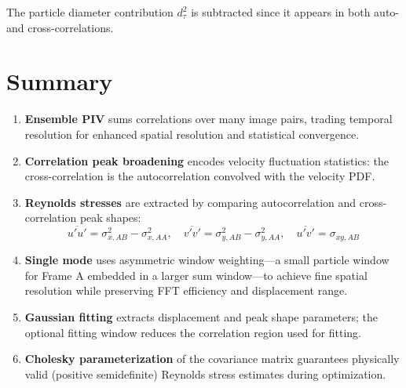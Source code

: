 \documentclass[11pt,a4paper]{article}
\begin{document}
The particle diameter contribution $d_\tau^2$ is subtracted since it appears in both auto- and cross-correlations.

\section{Summary}

\begin{enumerate}
    \item \textbf{Ensemble PIV} sums correlations over many image pairs, trading temporal resolution for enhanced spatial resolution and statistical convergence.

    \item \textbf{Correlation peak broadening} encodes velocity fluctuation statistics: the cross-correlation is the autocorrelation convolved with the velocity PDF.

    \item \textbf{Reynolds stresses} are extracted by comparing autocorrelation and cross-correlation peak shapes:
    \begin{equation*}
        \overline{u'u'} = \sigma_{x,AB}^2 - \sigma_{x,AA}^2, \quad \overline{v'v'} = \sigma_{y,AB}^2 - \sigma_{y,AA}^2, \quad \overline{u'v'} = \sigma_{xy,AB}
    \end{equation*}

    \item \textbf{Single mode} uses asymmetric window weighting---a small particle window for Frame A embedded in a larger sum window---to achieve fine spatial resolution while preserving FFT efficiency and displacement range.

    \item \textbf{Gaussian fitting} extracts displacement and peak shape parameters; the optional fitting window reduces the correlation region used for fitting.

    \item \textbf{Cholesky parameterization} of the covariance matrix guarantees physically valid (positive semidefinite) Reynolds stress estimates during optimization.
\end{enumerate}
\end{document}
